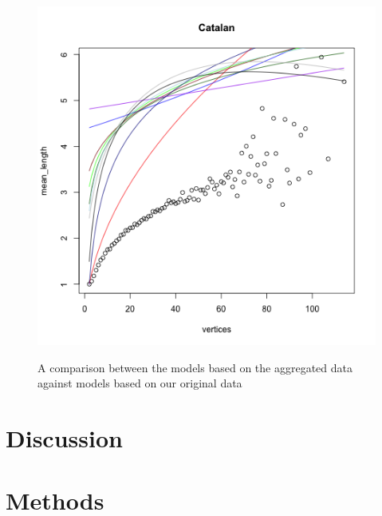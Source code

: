 \documentclass[paper=a4, fontsize=11pt]{scrartcl} %
\begin{document}
\begin{figure}
\begin{minipage}{\textwidth}
\begin{minipage}{.5\textwidth}
  \label{fig:cat3}
\end{minipage}%
\begin{minipage}{.5\textwidth}
  \centering
  \includegraphics[width=\linewidth]{Mean_Catalan4}
  \label{fig:cat4}
\end{minipage}
\end{minipage}
\caption{A comparison between the models based on the aggregated data against models based on our original data}
\end{figure}


\section{Discussion}



\section{Methods}
\end{document}
